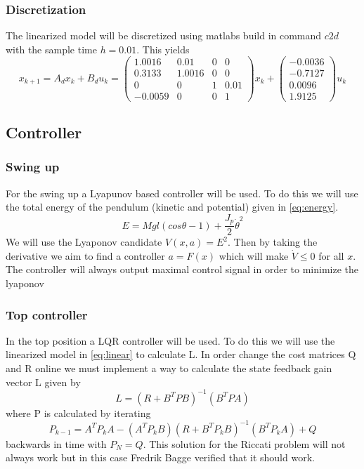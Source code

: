 \documentclass[10pt,a4paper]{article}
\begin{document}
\subsubsection{Discretization}
The linearized model will be discretized using matlabs build in command $c2d$ with the sample time $h=0.01$. This yields
\begin{equation}
x_{k+1} = A_dx_k + B_du_k =\begin{pmatrix}
 1.0016 & 0.01 & 0 & 0 \\
 0.3133 & 1.0016 & 0 & 0 \\
 0 & 0 & 1 & 0.01 \\
 -0.0059 & 0 & 0 & 1 
\end{pmatrix}x_k + \begin{pmatrix}
-0.0036\\
-0.7127\\
 0.0096\\
 1.9125
 \end{pmatrix}u_k
 \label{eq:discrete}
\end{equation}

\subsection{Controller}
\subsubsection{Swing up}
For the swing up a Lyapunov based controller will be used. To do this we will use the total energy of the pendulum (kinetic and potential) given in \ref{eq:energy}.
\begin{equation}
E= Mgl(cos\theta - 1)+\frac{J_p}{2}\dot\theta^2
\label{eq:energy}
\end{equation}
We will use the Lyaponov candidate $V(x,a)=E^2$. Then by taking the derivative we aim to find a controller $a=F(x)$ which will make $\dot V \leq 0$ for all $x$. The controller will always output maximal control signal in order to minimize the lyaponov
\subsubsection{Top controller}
In the top position a LQR controller will be used. To do this we will use the linearized model in \ref{eq:linear} to calculate L. In order change the cost matrices Q and R online we must implement a way to calculate the state feedback gain vector L given by
$$ L = (R+B^TPB)^{-1}(B^TPA) $$
where P is calculated by iterating
$$ P_{k-1} = A^TP_kA-(A^TP_kB)(R+B^TP_kB)^{-1}(B^TP_kA)+Q $$
backwards in time with $P_N = Q$. This solution for the Riccati problem will not always work but in this case Fredrik Bagge verified that it should work.
\end{document}
